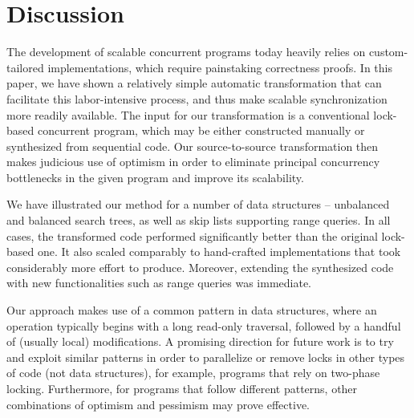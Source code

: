 \section{Discussion}\label{sec:discussion}

The development of scalable concurrent programs today
heavily relies on custom-tailored implementations, which require painstaking correctness proofs.
In this paper, we have shown a relatively simple automatic transformation that can facilitate this labor-intensive process, and
thus make scalable synchronization more readily available.
The input for our transformation is a conventional lock-based concurrent program, which may be either constructed manually or
synthesized from sequential code. Our source-to-source transformation then makes judicious use of optimism in order to
eliminate principal concurrency bottlenecks in the given program and improve its scalability.

We have illustrated our method for a number of data structures -- unbalanced and balanced search trees,  as well as
skip lists supporting range queries. 
In all cases, the transformed code performed significantly better than the original
lock-based one. It also scaled comparably  to hand-crafted
implementations that took considerably more effort to produce.
Moreover, extending the synthesized code with new functionalities
such as range queries was immediate. 
%

Our approach makes use of a common pattern in data structures, where an operation typically begins with a long read-only traversal, followed by a handful of (usually local) modifications.
A promising direction for future work  is to try and
exploit similar patterns in order to parallelize or remove locks in other types of code (not data structures), for example, programs that rely on two-phase locking.
Furthermore, for programs that follow different patterns, other combinations of optimism and pessimism may prove effective.

